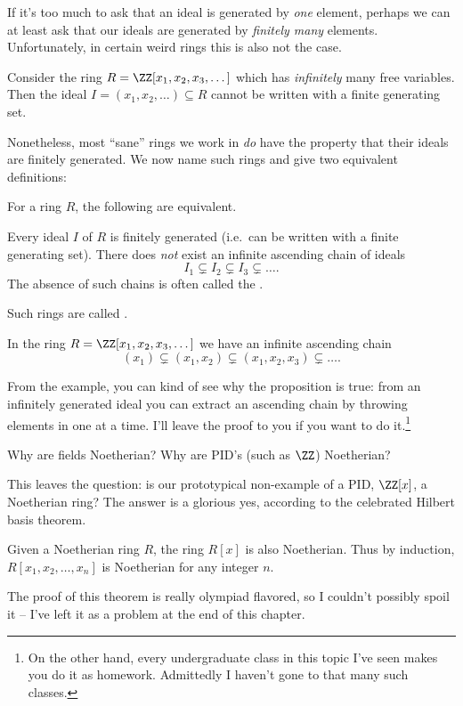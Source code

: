If it's too much to ask that an ideal is generated by \emph{one} element,
perhaps we can at least ask that our ideals are generated by \emph{finitely many} elements.
Unfortunately, in certain weird rings this is also not the case.
\begin{example}
	Consider the ring $R = \ZZ[x_1, x_2, x_3, \dots]$
	which has \emph{infinitely} many free variables.
	Then the ideal $I = (x_1, x_2, \dots) \subseteq R$
	cannot be written with a finite generating set.
\end{example}
Nonetheless, most ``sane'' rings we work in \emph{do} have the property that their ideals are finitely generated.
We now name such rings and give two equivalent definitions:
\begin{proposition}
	For a ring $R$, the following are equivalent.
	\begin{enumerate}[(a)]
		\ii Every ideal $I$ of $R$ is finitely generated (i.e.\ can be written with a finite generating set).
		\ii There does \emph{not} exist an infinite ascending chain of ideals
		\[ I_1 \subsetneq I_2 \subsetneq I_3 \subsetneq \dots. \]
		The absence of such chains is often called the .
	\end{enumerate}
	Such rings are called .
\end{proposition}
\begin{example}
	In the ring $R = \ZZ[x_1, x_2, x_3, \dots]$ we have
	an infinite ascending chain
	\[ (x_1) \subsetneq (x_1, x_2) \subsetneq (x_1,x_2,x_3) \subsetneq \dots. \]
\end{example}
From the example, you can kind of see why the proposition is true:
from an infinitely generated ideal you can extract an ascending chain
by throwing elements in one at a time.
I'll leave the proof to you if you want to do it.\footnote{On the other hand, every undergraduate class in this topic I've seen makes you do it as homework. Admittedly I haven't gone to that many such classes.}

\begin{ques}
	Why are fields Noetherian?
	Why are PID's (such as $\ZZ$) Noetherian?
\end{ques}
This leaves the question:
is our prototypical non-example of a PID,
$\ZZ[x]$, a Noetherian ring?
The answer is a glorious yes,
according to the celebrated Hilbert basis theorem.
\begin{theorem}
	Given a Noetherian ring $R$,
	the ring $R[x]$ is also Noetherian.
	Thus by induction, $R[x_1, x_2, \dots, x_n]$ is Noetherian
	for any integer $n$.
	\label{thm:hilbert_basis}
\end{theorem}
The proof of this theorem is really olympiad flavored, so I couldn't possibly spoil it -- I've
left it as a problem at the end of this chapter.

